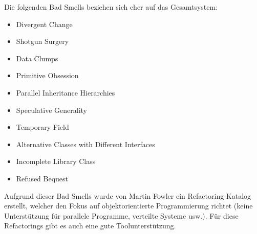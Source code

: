 Die folgenden Bad Smells beziehen sich eher auf das Gesamtsystem:
\begin{itemize}
	\item Divergent Change
	\item Shotgun Surgery
	\item Data Clumps
	\item Primitive Obsession
	\item Parallel Inheritance Hierarchies
	\item Speculative Generality
	\item Temporary Field
	\item Alternative Classes with Different Interfaces
	\item Incomplete Library Class
	\item Refused Bequest
\end{itemize}
Aufgrund dieser Bad Smells wurde von Martin Fowler ein Refactoring-Katalog erstellt, welcher den Fokus auf objektorientierte Programmierung richtet (keine Unterstützung für parallele Programme, verteilte Systeme usw.). Für diese Refactorings gibt es auch eine gute Toolunterstützung. 
